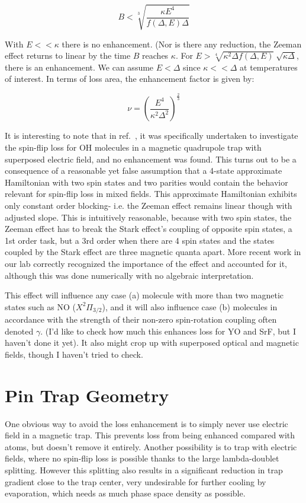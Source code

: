 \documentclass[%
 reprint,
 amsmath,amssymb,
 aps,
prl,
]{revtex4-1}
\begin{document}
\begin{equation}
B < \sqrt[3]{\frac{\kappa E^4}{f(\Delta,E)\Delta}}
\end{equation}

With $E<<\kappa$ there is no enhancement. (Nor is there any reduction, the Zeeman effect returns to linear by the time $B$ reaches $\kappa$. For $E>\sqrt[4]{\kappa^2\Delta f(\Delta,E)}~\sqrt{\kappa\Delta}$, there is an enhancement. We can assume $E<\Delta$ since $\kappa<<\Delta$ at temperatures of interest. In terms of loss area, the enhancement factor is given by:

\begin{equation}
\nu = \left(\frac{E^4}{\kappa^2\Delta^2}\right)^\frac{2}{3}\label{eq:blimit}
\end{equation} 

It is interesting to note that in ref.~\cite{Lara2008}, it was specifically undertaken to investigate the spin-flip loss for OH molecules in a magnetic quadrupole trap with superposed electric field, and no enhancement was found. This turns out to be a consequence of a reasonable yet false assumption that a 4-state approximate Hamiltonian with two spin states and two parities would contain the behavior relevant for spin-flip loss in mixed fields. This approximate Hamiltonian exhibits only constant order blocking- i.e. the Zeeman effect remains linear though with adjusted slope. This is intuitively reasonable, because with two spin states, the Zeeman effect has to break the Stark effect's coupling of opposite spin states, a 1st order task, but a 3rd order when there are 4 spin states and the states coupled by the Stark effect are three magnetic quanta apart. More recent work in our lab correctly recognized the importance of the effect and accounted for it, although this was done numerically with no algebraic interpretation.

This effect will influence any case (a) molecule with more than two magnetic states such as NO ($X^2\Pi_{3/2}$), and it will also influence case (b) molecules in accordance with the strength of their non-zero spin-rotation coupling often denoted $\gamma$. (I'd like to check how much this enhances loss for YO and SrF, but I haven't done it yet). It also might crop up with superposed optical and magnetic fields, though I haven't tried to check.

\section{Pin Trap Geometry \label{sec:ptg} }
One obvious way to avoid the loss enhancement is to simply never use electric field in a magnetic trap. This prevents loss from being enhanced compared with atoms, but doesn't remove it entirely. Another possibility is to trap with electric fields, where no spin-flip loss is possible thanks to the large lambda-doublet splitting. However this splitting also results in a significant reduction in trap gradient close to the trap center, very undesirable for further cooling by evaporation, which needs as much phase space density as possible.
\end{document}
